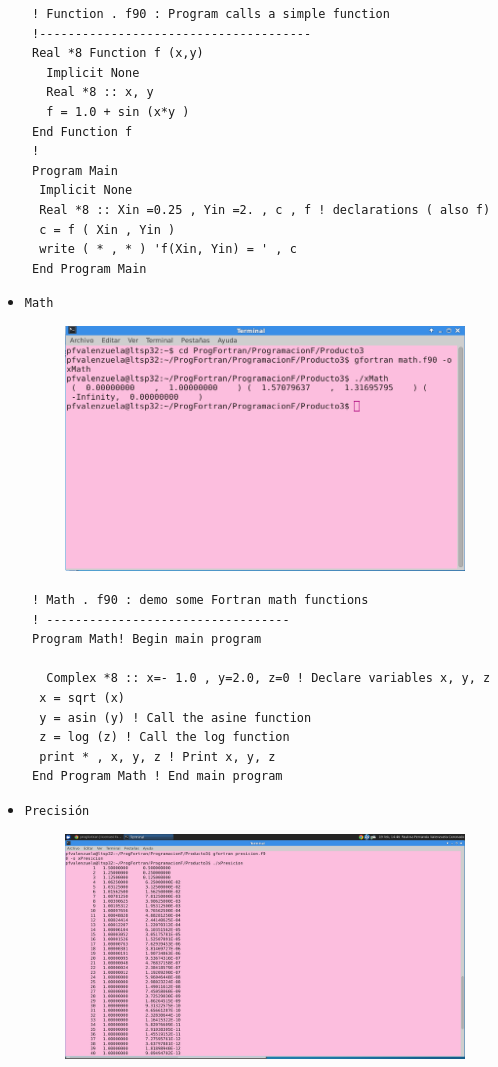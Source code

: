 \documentclass[12pt]{article}
\begin{document}
\begin{itemize}
\begin{verbatim}
 ! Function . f90 : Program calls a simple function
 !--------------------------------------
 Real *8 Function f (x,y)
   Implicit None
   Real *8 :: x, y
   f = 1.0 + sin (x*y )
 End Function f
 !
 Program Main
  Implicit None 
  Real *8 :: Xin =0.25 , Yin =2. , c , f ! declarations ( also f)
  c = f ( Xin , Yin )
  write ( * , * ) 'f(Xin, Yin) = ' , c
 End Program Main 
 \end{verbatim}
 
\item {\tt Math } 
\begin{figure}[h]
\centering
\includegraphics[scale=0.5]{math.png}
\end{figure}
\begin{verbatim}
 ! Math . f90 : demo some Fortran math functions
 ! ----------------------------------
 Program Math! Begin main program

   Complex *8 :: x=- 1.0 , y=2.0, z=0 ! Declare variables x, y, z
  x = sqrt (x)  
  y = asin (y) ! Call the asine function
  z = log (z) ! Call the log function
  print * , x, y, z ! Print x, y, z
 End Program Math ! End main program 
\end{verbatim}
 
 \item {\tt Precisión}
 \begin{figure}[h]
\centering
\includegraphics[scale=0.5]{presicion.png}
\end{figure}
 

\end{itemize}
\end{document}
